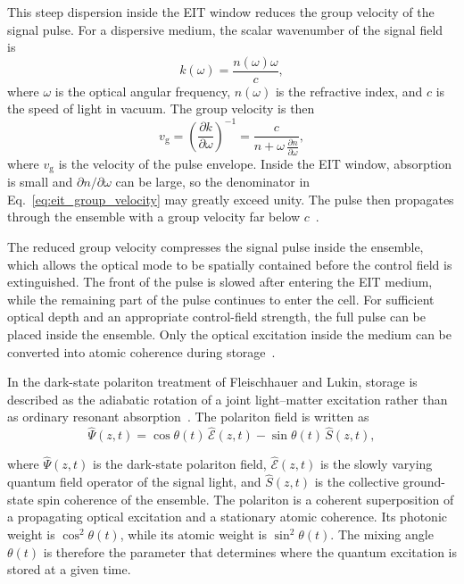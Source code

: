 This steep dispersion inside the EIT window reduces the group velocity of the signal pulse. For a dispersive medium, the scalar wavenumber of the signal field is~\cite{Apgteitiav_FinkelsteinEtAl_2023,}
\begin{equation}
    k(\omega)
    =
    \frac{n(\omega)\omega}{c},
    \label{eq:eit_dispersion_relation}
\end{equation}
where $\omega$ is the optical angular frequency, $n(\omega)$ is the refractive index, and $c$ is the speed of light in vacuum. The group velocity is then~\cite{Apgteitiav_FinkelsteinEtAl_2023,Psliwavueit_DeRoseEtAl_2023a}
\begin{equation}
    v_{\mathrm{g}}
    =
    \left(\frac{\partial k}{\partial\omega}\right)^{-1}
    =
    \frac{c}
    {n+\omega\,\frac{\partial n}{\partial\omega}},
    \label{eq:eit_group_velocity}
\end{equation}
where $v_{\mathrm{g}}$ is the velocity of the pulse envelope. Inside the EIT window, absorption is small and $\partial n/\partial\omega$ can be large, so the denominator in Eq.~\eqref{eq:eit_group_velocity} may greatly exceed unity. The pulse then propagates through the ensemble with a group velocity far below $c$~\cite{Apgteitiav_FinkelsteinEtAl_2023,Psliwavueit_DeRoseEtAl_2023a,}.

The reduced group velocity compresses the signal pulse inside the ensemble, which allows the optical mode to be spatially contained before the control field is extinguished. The front of the pulse is slowed after entering the EIT medium, while the remaining part of the pulse continues to enter the cell. For sufficient optical depth and an appropriate control-field strength, the full pulse can be placed inside the ensemble. Only the optical excitation inside the medium can be converted into atomic coherence during storage~\cite{QmfpDp_FleischhauerEtAl_2002,Psliwavueit_DeRoseEtAl_2023a,SoLiAV_PhillipsEtAl_2001,}.

In the dark-state polariton treatment of Fleischhauer and Lukin, storage is described as the adiabatic rotation of a joint light--matter excitation rather than as ordinary resonant absorption~\cite{QmfpDp_FleischhauerEtAl_2002}. The polariton field is written as
\begin{equation}
    \hat{\Psi}(z,t)
    =
    \cos\theta(t)\,\hat{\mathcal{E}}(z,t)
    -
    \sin\theta(t)\,\hat{S}(z,t),
    \label{eq:dark_state_polariton}
\end{equation}

where $\hat{\Psi}(z,t)$ is the dark-state polariton field, $\hat{\mathcal{E}}(z,t)$ is the slowly varying quantum field operator of the signal light, and $\hat{S}(z,t)$ is the collective ground-state spin coherence of the ensemble. The polariton is a coherent superposition of a propagating optical excitation and a stationary atomic coherence. Its photonic weight is $\cos^2\theta(t)$, while its atomic weight is $\sin^2\theta(t)$. The mixing angle $\theta(t)$ is therefore the parameter that determines where the quantum excitation is stored at a given time.

